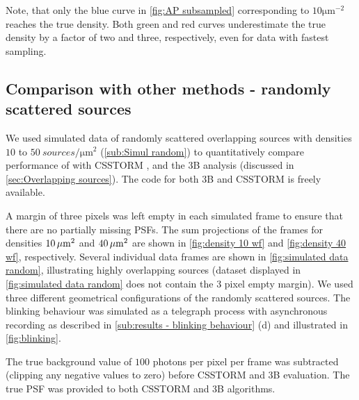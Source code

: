 Note, that only the blue curve in \autoref{fig:AP subsampled}\aaa{} corresponding to $10\unit{\um}^{-2}$ reaches the true density. Both green and red curves underestimate the true density by a factor of two and three, respectively, even for data with fastest sampling. 



\subsection{Comparison with other methods - randomly scattered sources\label{sub:results - comparison}} %
We used simulated data of randomly scattered overlapping sources with densities $10$ to $50\ \unit{sources/\um^2}$ (\autoref{sub:Simul random}) to quantitatively compare performance of \inmf{} with CSSTORM \cite{Zhu2012}, and the 3B analysis \cite{Cox2011} (discussed in \autoref{sec:Overlapping sources}). The code for both 3B and CSSTORM is freely available.  

A margin of three pixels was left empty in each simulated frame to ensure that there are no partially missing PSFs. The sum projections of the frames for densities $10 \, \mathrm{\mu m}^2$ and $40 \, \mathrm{\mu m}^2$ are shown in \autoref{fig:density 10 wf} and \ref{fig:density 40 wf}, respectively. Several individual data frames are shown in \autoref{fig:simulated data random}, illustrating highly overlapping sources (dataset displayed in \autoref{fig:simulated data random} does not contain the 3 pixel empty margin). We used three different geometrical configurations of the randomly scattered sources. The blinking behaviour was simulated as a telegraph process with asynchronous recording as described in \autoref{sub:results - blinking behaviour} (d) and illustrated in \autoref{fig:blinking}\ddd.

The true background value of $100$ photons per pixel per frame was subtracted (clipping any negative values to zero) before CSSTORM and 3B evaluation. The true PSF was provided to both CSSTORM and 3B algorithms. 

